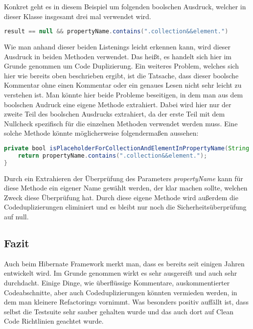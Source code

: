Konkret geht es in diesem Beispiel um folgenden boolschen Ausdruck, welcher in dieser Klasse insgesamt drei mal verwendet wird.

\begin{lstlisting}[language=Java, caption=Boolscher Audruck, label=lst:GetByPredicate]
result == null && propertyName.contains(".collection&&element.")
\end{lstlisting}

Wie man anhand dieser beiden Listenings leicht erkennen kann, wird dieser Ausdruck in beiden Methoden verwendet. Das heißt, es handelt sich hier im Grunde genommen um Code Duplizierung. Ein weiteres Problem, welches sich hier wie bereits oben beschrieben ergibt, ist die Tatsache, dass dieser boolsche Kommentar ohne einen Kommentar oder ein genaues Lesen nicht sehr leicht zu verstehen ist. Man könnte hier beide Probleme beseitigen, in dem man aus dem boolschen Audruck eine eigene Methode extrahiert. Dabei wird hier nur der zweite Teil des boolschen Ausdrucks extrahiert, da der erste Teil mit dem Nullcheck spezifisch für die einzelnen Methoden verwendet werden muss. Eine solche Methode könnte möglicherweise folgendermaßen aussehen:

\begin{lstlisting}[language=Java, caption=Boolscher Ausdruck neu, label=lst:GetByPredicate]
private bool isPlaceholderForCollectionAndElementInPropertyName(String propertyName) {
	return propertyName.contains(".collection&&element.");
}
\end{lstlisting}

Durch ein Extrahieren der Überprüfung des Parameters \textit{propertyName} kann für diese Methode ein eigener Name gewählt werden, der klar machen sollte, welchen Zweck diese Überprüfung hat. Durch diese eigene Methode wird außerdem die Codeduplizierungen eliminiert und es bleibt nur noch die Sicherheitsüberprüfung auf null.

\subsection{Fazit}
Auch beim Hibernate Framework merkt man, dass es bereits seit einigen Jahren entwickelt wird. Im Grunde genommen wirkt es sehr ausgereift und auch sehr durchdacht. Einige Dinge, wie überflüssige Kommentare, auskommentierter Codeabschnitte, aber auch Codeduplizierungen könnten vermieden werden, in dem man kleinere Refactorings vornimmt. Was besonders positiv auffällt ist, dass selbst die Testsuite sehr sauber gehalten wurde und das auch dort auf Clean Code Richtlinien geachtet wurde. 
